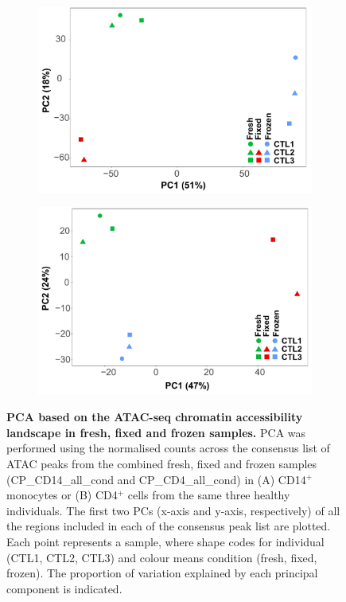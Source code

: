 \begin{figure}[htbp]
\centering
\begin{subfigure}{0.5\textwidth}
\centering
\includegraphics[width=\textwidth]{./Results1/pdfs/Core_ATAC_CD14_fresh_frozen_fixed_no_CTL1_fixed_PCA}
\caption{\textbf{}}
\end{subfigure}%
\begin{subfigure}{0.5\textwidth}
\centering
\includegraphics[width=\textwidth]{./Results1/pdfs/Core_ATAC_CD4_fresh_frozen_fixed_no_CTL1_fixed_PCA}
\caption{\textbf{}}
\end{subfigure}
\caption[PCA based on the ATAC-seq chromatin accessibility landscape in fresh, fixed and frozen samples.]{\textbf{PCA based on the ATAC-seq chromatin accessibility landscape in fresh, fixed and frozen samples.} PCA was performed using the normalised counts across the consensus list of ATAC peaks from the combined fresh, fixed and frozen samples (CP\_CD14\_all\_cond and CP\_CD4\_all\_cond) in (A) CD14$^+$ monocytes or (B) CD4$^+$ cells from the same three healthy individuals. The first two PCs (x-axis and y-axis, respectively) of all the regions included in each of the consensus peak list are plotted. Each point represents a sample, where shape codes for individual (CTL1, CTL2, CTL3) and colour means condition (fresh, fixed, frozen). The proportion of variation explained by each principal component is indicated.}
\label{figure:Core_ATAC_all_conditions_PCA}
\end{figure}




